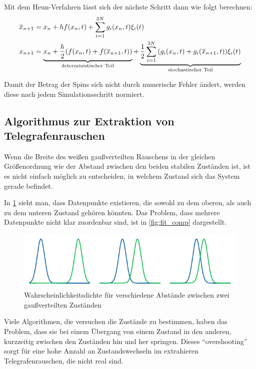 \documentclass[main.tex]{subfiles}
\begin{document}
Mit dem Heun-Verfahren lässt sich der nächste Schritt dann wie folgt berechnen:
\begin{align}
    \overline{x}_{n+1} &= x_n + h f(x_n,t) + \sum_{i=1}^{3N} g_i(x_n,t) \xi_i(t) \\
    x_{n+1} &= \underbrace{x_n + \frac{h}{2} \qty(f(x_n,t) + f(\overline{x}_{n+1},t))}_\text{deterministischer Teil} + \underbrace{\frac{1}{2} \sum_{i=1}^{3N} \qty(g_i(x_n,t) + g_i(\overline{x}_{n+1},t)) \xi_i(t)}_\text{stochastischer Teil}
\end{align}

Damit der Betrag der Spins sich nicht durch numerische Fehler ändert, werden diese nach jedem Simulationsschritt normiert.

\subsection{Algorithmus zur Extraktion von Telegrafenrauschen}\label{algo}

Wenn die Breite des weißen gaußverteilten Rauschens in der gleichen Größenordnung wie der Abstand zwischen den beiden stabilen Zuständen ist, ist es nicht einfach möglich zu entscheiden, in welchem Zustand sich das System gerade befindet.

In \cref{fig:gauss-overlap} sieht man, dass Datenpunkte existieren, die sowohl zu dem oberen, als auch zu dem unteren Zustand gehören könnten. Das Problem, dass mehrere Datenpunkte nicht klar zuordenbar sind, ist in \ref{fig:fit_comp} dargestellt.

\begin{figure}[h]
    \centering
    \includegraphics{bilder/plots/theo-vis/gauss-overlap.pdf}
    \caption{Wahrscheinlichkeitsdichte für verschiedene Abstände zwischen zwei gaußverteilten Zuständen \label{fig:gauss-overlap}}
\end{figure}

Viele Algorithmen, die versuchen die Zustände zu bestimmen, haben das Problem, dass sie bei einem Übergang von einem Zustand in den anderen, kurzzeitig zwischen den Zuständen hin und her springen. Dieses \enquote{overshooting} sorgt für eine hohe Anzahl an Zustandswechseln im extrahieren Telegrafenrauschen, die nicht real sind.
\end{document}
